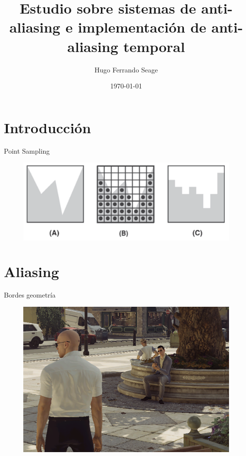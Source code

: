 \documentclass[table]{beamer}
\title{Estudio sobre sistemas de anti-aliasing e implementación de anti-aliasing temporal}
\date{\today}
\author{Hugo Ferrando Seage}
\institute{U-Tad - Máster Universitario en Computación Gráfica y Simulación} %
\begin{document}
\frame{\titlepage}

\section{Introducción}

\begin{frame}[fragile]{Point Sampling}
    \begin{figure}
        \includegraphics[width=\linewidth]{./figures/pointsampling.png}
    \end{figure}
\end{frame}

\section{Aliasing}

\begin{frame}[fragile]{Bordes geometría}
    \begin{figure}
        \includegraphics[width=\linewidth]{./figures/hitmanaliasing.png}
    \end{figure}
\end{frame}
\end{document}
